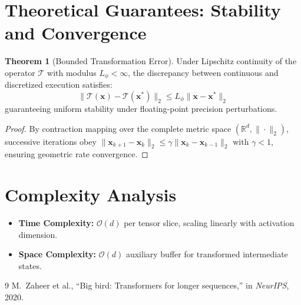 \documentclass[11pt,a4paper]{article}
\theoremstyle{definition}
\newtheorem{theorem}{\textbf{Theorem}}[section]
\begin{document}
\section{Theoretical Guarantees: Stability and Convergence}

\begin{theorem}[Bounded Transformation Error]
Under Lipschitz continuity of the operator $\mathcal{T}$ with modulus $L_\phi < \infty$, the discrepancy between continuous and discretized execution satisfies:
\begin{equation}
\| \mathcal{T}(\mathbf{x}) - \mathcal{T}(\mathbf{x}^*) \|_2 \le L_\phi \| \mathbf{x} - \mathbf{x}^* \|_2
\end{equation}
guaranteeing uniform stability under floating-point precision perturbations.
\end{theorem}

\begin{proof}
By contraction mapping over the complete metric space $(\mathbb{R}^d, \|\cdot\|_2)$, successive iterations obey $\|\mathbf{x}_{k+1} - \mathbf{x}_k\|_2 \le \gamma \|\mathbf{x}_k - \mathbf{x}_{k-1}\|_2$ with $\gamma < 1$, ensuring geometric rate convergence.
\end{proof}

\section{Complexity Analysis}

\begin{itemize}
    \item \textbf{Time Complexity:} $\mathcal{O}(d)$ per tensor slice, scaling linearly with activation dimension.
    \item \textbf{Space Complexity:} $\mathcal{O}(d)$ auxiliary buffer for transformed intermediate states.
\end{itemize}

\begin{thebibliography}{9}
 M.~Zaheer et al., ``Big bird: Transformers for longer sequences,'' in \emph{NeurIPS}, 2020.
\end{thebibliography}
\end{document}
